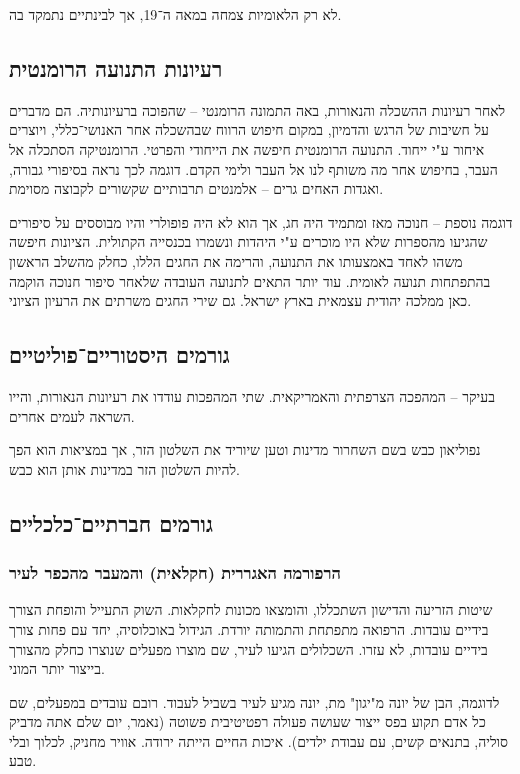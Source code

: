 \documentclass[a4paper]{book}
\begin{document}
	לא רק הלאומיות צמחה במאה ה־19, אך לבינתיים נתמקד בה. 
	
	\subsection{רעיונות התנועה הרומנטית}
	לאחר רעיונות ההשכלה והנאורות, באה התמונה הרומנטי – שהפוכה ברעיונותיה. הם מדברים על חשיבות של הרגש והדמיון, במקום חיפוש הרווח שבהשכלה אחר האנושי־כללי, ויוצרים איחור ע"י ייחוד. התנועה הרומנטית חיפשה את הייחודי והפרטי. הרומנטיקה הסתכלה אל העבר, בחיפוש אחר מה משותף לנו אל העבר ולימי הקדם. דוגמה לכך נראה בסיפורי גבורה, ואגדות האחים גרים – אלמנטים תרבותיים שקשורים לקבוצה מסוימת. 
	
	דוגמה נוספת – חנוכה מאז ומתמיד היה חג, אך הוא לא היה פופולרי והיו מבוססים על סיפורים שהגיעו מהספרות שלא היו מוכרים ע"י היהדות ונשמרו בכנסייה הקתולית. הציונות חיפשה משהו לאחד באמצעותו את התנועה, והרימה את החגים הללו, כחלק מהשלב הראשון בהתפתחות תנועה לאומית. עוד יותר התאים לתנועה העובדה שלאחר סיפור חנוכה הוקמה כאן ממלכה יהודית עצמאית בארץ ישראל. גם שירי החגים משרתים את הרעיון הציוני. 
	
	\subsection{גורמים היסטוריים־פוליטיים}
	בעיקר – המהפכה הצרפתית והאמריקאית. שתי המהפכות עודדו את רעיונות הנאורות, והייו השראה לעמים אחרים. 
	
	נפוליאון כבש בשם השחרור מדינות וטען שיוריד את השלטון הזר, אך במציאות הוא הפך להיות השלטון הזר במדינות אותן הוא כבש. 
	\subsection{גורמים חברתיים־כלכליים}
	\subsubsection{הרפורמה האגררית (חקלאית) והמעבר מהכפר לעיר}
	שיטות הזריעה והדישון השתכללו, והומצאו מכונות לחקלאות. השוק התעייל והופחת הצורך בידיים עובדות. הרפואה מתפתחת והתמותה יורדת. הגידול באוכלוסיה, יחד עם פחות צורך בידיים עובדות, לא עזרו. השכלולים הגיעו לעיר, שם מוצרו מפעלים שנוצרו כחלק מהצורך בייצור יותר המוני. 
	
	לדוגמה, הבן של יונה מ"יגון" מת, יונה מגיע לעיר בשביל לעבוד. רובם עובדים במפעלים, שם כל אדם תקוע בפס ייצור שעושה פעולה רפטיטיבית פשוטה (נאמר, יום שלם אתה מדביק סוליה, בתנאים קשים, עם עבודת ילדים). איכות החיים הייתה ירודה. אוויר מחניק, לכלוך ובלי טבע. 
	
\end{document}
